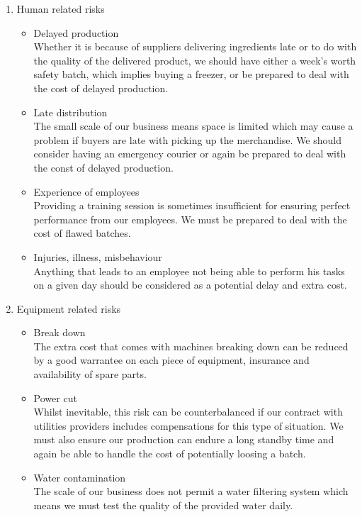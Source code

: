 \documentclass[11pt]{article}
\begin{document}
  \begin{enumerate}
  \item Human related risks
    \begin{itemize}
    \item Delayed production \\ Whether it is because of suppliers delivering ingredients late or to do with the quality of the delivered product, we should have either a week's worth safety batch, which implies buying a freezer, or be prepared to deal with the cost of delayed production.
    \item Late distribution \\
The small scale of our business means space is limited which may cause a problem if buyers are late with picking up the merchandise. We should consider having an emergency courier  or again be prepared to deal with the const of delayed production.
    \item Experience of employees \\
Providing a training session is sometimes insufficient for ensuring perfect performance from our employees. We must be prepared to deal with the cost of flawed batches.
    \item Injuries, illness, misbehaviour \\
Anything that leads to an employee not being able to perform his tasks on a given day should be considered as a potential delay and extra cost.
    \end{itemize}

  \item Equipment related risks
    \begin{itemize}
    \item Break down \\
The extra cost that comes with machines breaking down can be reduced by a good warrantee on each piece of equipment, insurance and availability of spare parts.
    \item Power cut \\
Whilst inevitable, this risk can be counterbalanced if our contract with utilities providers includes compensations for this type of situation. We must also ensure our production can endure a long standby time and again be able to handle the cost of potentially loosing a batch.
    \item Water contamination \\
The scale of our business does not permit a water filtering system which means we must test the quality of the provided water daily.
    \end{itemize}


\end{enumerate}
\end{document}
